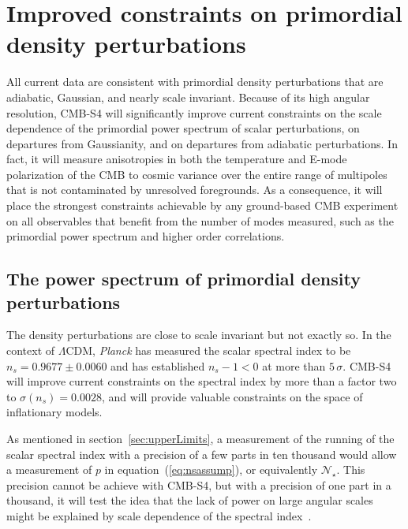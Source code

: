 \section{Improved constraints on primordial density perturbations}
\label{sec:scalar}
All current data are consistent with primordial density perturbations that are adiabatic, Gaussian, and nearly scale invariant. Because of its high angular resolution, CMB-S4 will significantly improve current constraints on the scale dependence of the primordial power spectrum of scalar perturbations, on departures from Gaussianity, and on departures from adiabatic perturbations. In fact, it will measure anisotropies in both the temperature and E-mode polarization of the CMB to cosmic variance over the entire range of multipoles that is not contaminated by unresolved foregrounds. As a consequence, it will place the strongest constraints achievable by any ground-based CMB experiment on all observables that benefit from the number of modes measured, such as the primordial power spectrum and higher order correlations.

\subsection{The power spectrum of primordial density perturbations}
The density perturbations are close to scale invariant but not exactly so. In the context of $\Lambda$CDM, {\it Planck} has measured the scalar spectral index to be $n_s=0.9677\pm0.0060$ and has established $n_s-1<0$ at more than $5\,\sigma$. CMB-S4 will improve current constraints on the spectral index by more than a factor two to $\sigma(n_s)=0.0028$, and will provide valuable constraints on the space of inflationary models. 

As mentioned in section~\ref{sec:upperLimits}, a measurement of the running of the scalar spectral index with a precision of a few parts in ten thousand would allow a measurement of $p$ in equation~(\ref{eq:nsassump}), or equivalently $\mathcal{N}_\star$. This precision cannot be achieve with CMB-S4, but with a precision of one part in a thousand, it will test the idea that the lack of power on large angular scales might be explained by scale dependence of the spectral index~\cite{Meerburg:2014bpa}.  

